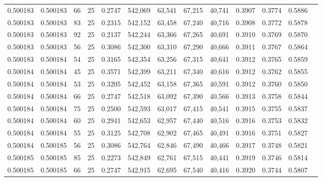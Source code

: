 \begin{tabular}{rrrrrrrrrrrrr}
0.500183 & 0.500183 &    66 &  25 &                                     0.2747 & 542,069 &  63,541 &  67,215 &  40,741 & 0.3907 & 0.3774 & 0.5886 \\
0.500183 & 0.500183 &    83 &  25 &                                     0.2315 & 542,152 &  63,458 &  67,240 &  40,716 & 0.3908 & 0.3772 & 0.5878 \\
0.500183 & 0.500183 &    92 &  25 &                                     0.2137 & 542,244 &  63,366 &  67,265 &  40,691 & 0.3910 & 0.3769 & 0.5870 \\
0.500183 & 0.500183 &    56 &  25 &                                     0.3086 & 542,300 &  63,310 &  67,290 &  40,666 & 0.3911 & 0.3767 & 0.5864 \\
0.500183 & 0.500184 &    54 &  25 &                                     0.3165 & 542,354 &  63,256 &  67,315 &  40,641 & 0.3912 & 0.3765 & 0.5859 \\
0.500184 & 0.500184 &    45 &  25 &                                     0.3571 & 542,399 &  63,211 &  67,340 &  40,616 & 0.3912 & 0.3762 & 0.5855 \\
0.500184 & 0.500184 &    53 &  25 &                                     0.3205 & 542,452 &  63,158 &  67,365 &  40,591 & 0.3912 & 0.3760 & 0.5850 \\
0.500184 & 0.500184 &    66 &  25 &                                     0.2747 & 542,518 &  63,092 &  67,390 &  40,566 & 0.3913 & 0.3758 & 0.5844 \\
0.500184 & 0.500184 &    75 &  25 &                                     0.2500 & 542,593 &  63,017 &  67,415 &  40,541 & 0.3915 & 0.3755 & 0.5837 \\
0.500184 & 0.500184 &    60 &  25 &                                     0.2941 & 542,653 &  62,957 &  67,440 &  40,516 & 0.3916 & 0.3753 & 0.5832 \\
0.500184 & 0.500184 &    55 &  25 &                                     0.3125 & 542,708 &  62,902 &  67,465 &  40,491 & 0.3916 & 0.3751 & 0.5827 \\
0.500184 & 0.500185 &    56 &  25 &                                     0.3086 & 542,764 &  62,846 &  67,490 &  40,466 & 0.3917 & 0.3748 & 0.5821 \\
0.500185 & 0.500185 &    85 &  25 &                                     0.2273 & 542,849 &  62,761 &  67,515 &  40,441 & 0.3919 & 0.3746 & 0.5814 \\
0.500185 & 0.500185 &    66 &  25 &                                     0.2747 & 542,915 &  62,695 &  67,540 &  40,416 & 0.3920 & 0.3744 & 0.5807 \\

\end{tabular}
